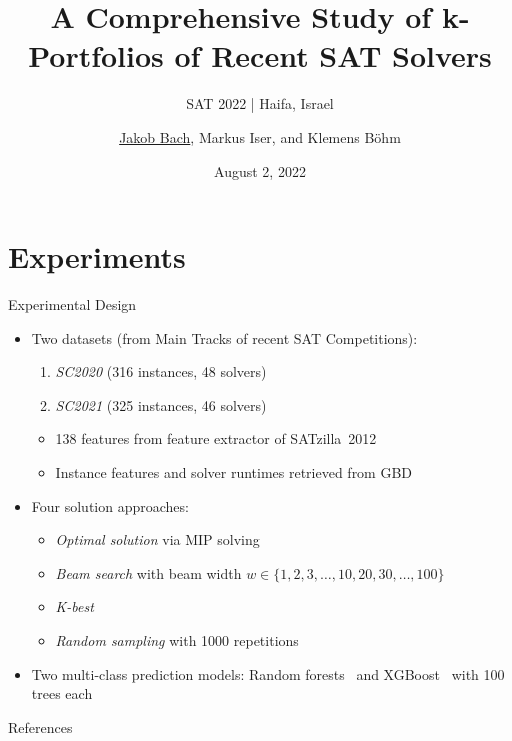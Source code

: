 \documentclass[en]{sdqbeamer}
\title[A Comprehensive Study of k-Portfolios of Recent SAT Solvers]{A Comprehensive Study of k-Portfolios of Recent SAT Solvers} %
\subtitle{SAT 2022 | Haifa, Israel}
\author[\underline{Jakob Bach}, Markus Iser, and Klemens Böhm]{\underline{Jakob Bach}, Markus Iser, and Klemens Böhm} %
\date[2022-08-02]{August 2, 2022} %
\begin{document}
\KITtitleframe

\section{Experiments}

\begin{frame}[t]{Experimental Design}
	\begin{itemize}
		\item Two datasets (from Main Tracks of recent SAT Competitions):
		\begin{enumerate}[1)]
			\item \emph{SC2020} (316 instances, 48 solvers)~\cite{balyo2020proceedings}
			\item \emph{SC2021} (325 instances, 46 solvers)~\cite{balyo2021proceedings}
		\end{enumerate}
		\begin{itemize}
			\item 138 features from feature extractor of SATzilla~2012~\cite{xu2012features, xu2012satzilla2012}
			\item Instance features and solver runtimes retrieved from GBD~\cite{iser2020collaborative}
		\end{itemize}
		\pause
		\vspace{\baselineskip}
		\item Four solution approaches:
		\begin{itemize}
			\item \emph{Optimal solution} via MIP solving~\cite{python-mip}
			\item \emph{Beam search} with beam width $w \in \{1, 2, 3, \dots, 10, 20, 30, \dots, 100\}$
			\item \emph{K-best}
			\item \emph{Random sampling} with 1000 repetitions
		\end{itemize}
		\pause
		\vspace{\baselineskip}
		\item Two multi-class prediction models: Random forests~\cite{breiman2001random, scikit-learn} and XGBoost~\cite{xgboost} with 100 trees each
	\end{itemize}
\end{frame}

\appendix
\beginbackup %

\begin{frame}[t, allowframebreaks]{References}
	\printbibliography
\end{frame}

\backupend
\end{document}
